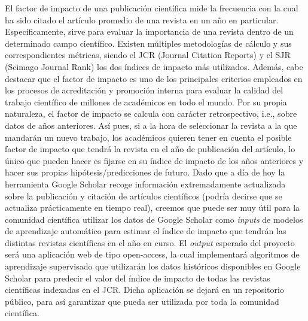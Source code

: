 
El factor de impacto de una publicación científica mide la frecuencia con la cual ha sido citado el artículo promedio de una revista en un año en particular. Específicamente, sirve para evaluar la importancia de una revista dentro de un determinado campo científico. Existen múltiples metodologías de cálculo y sus correspondientes métricas, siendo el JCR (Journal Citation Reports) y el SJR (Scimago Journal Rank) los dos índices de impacto más utilizados.
Además, cabe destacar que el factor de impacto es uno de los principales criterios empleados en los procesos de acreditación y promoción interna para evaluar la calidad del trabajo científico de millones de académicos en todo el mundo.
Por su propia naturaleza, el factor de impacto se calcula con carácter retrospectivo, i.e., sobre datos de años anteriores. Así pues, si a la hora de seleccionar la revista a la que mandarán un nuevo trabajo, los académicos quieren tener en cuenta el posible factor de impacto que tendrá la revista en el año de publicación del artículo, lo único que pueden hacer es fijarse en su índice de impacto de los años anteriores y hacer sus propias hipótesis/predicciones de futuro.
Dado que a día de hoy la herramienta Google Scholar recoge información extremadamente actualizada sobre la publicación y citación de artículos científicos (podría decirse que se actualiza prácticamente en tiempo real), creemos que puede ser muy útil para la comunidad científica utilizar los datos de Google Scholar como \textit{inputs} de modelos de aprendizaje automático para estimar el índice de impacto que tendrán las distintas revistas científicas en el año en curso.
El \textit{output} esperado del proyecto será una aplicación web de tipo open-access, la cual implementará algoritmos de aprendizaje supervisado que utilizarán los datos históricos disponibles en Google Scholar para predecir el valor del índice de impacto de todas las revistas científicas indexadas en el JCR. Dicha aplicación se dejará en un repositorio público, para así garantizar que pueda ser utilizada por toda la comunidad científica. 
